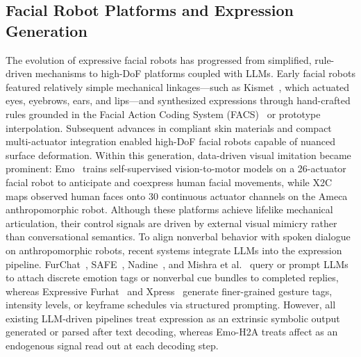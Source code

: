 \documentclass[letterpaper, 10 pt, conference]{ieeeconf}
\begin{document}
\subsection{Facial Robot Platforms and Expression Generation}
The evolution of expressive facial robots has progressed from simplified, rule-driven mechanisms to high-DoF platforms coupled with LLMs. Early facial robots featured relatively simple mechanical linkages---such as Kismet~\cite{breazeal2002designing}, which actuated eyes, eyebrows, ears, and lips---and synthesized expressions through hand-crafted rules grounded in the Facial Action Coding System (FACS)~\cite{ekman1978facs} or prototype interpolation. Subsequent advances in compliant skin materials and compact multi-actuator integration enabled high-DoF facial robots capable of nuanced surface deformation. Within this generation, data-driven visual imitation became prominent: Emo~\cite{hu2024emo} trains self-supervised vision-to-motor models on a 26-actuator facial robot to anticipate and coexpress human facial movements, while X2C~\cite{li2025x2c} maps observed human faces onto 30 continuous actuator channels on the Ameca anthropomorphic robot. Although these platforms achieve lifelike mechanical articulation, their control signals are driven by external visual mimicry rather than conversational semantics. To align nonverbal behavior with spoken dialogue on anthropomorphic robots, recent systems integrate LLMs into the expression pipeline. FurChat~\cite{cherakara2023furchat}, SAFE~\cite{lee2023safe}, Nadine~\cite{kang2024nadine}, and Mishra et al.~\cite{mishra2023realtime} query or prompt LLMs to attach discrete emotion tags or nonverbal cue bundles to completed replies, whereas Expressive Furhat~\cite{abbo2025expressive} and Xpress~\cite{antony2025xpress} generate finer-grained gesture tags, intensity levels, or keyframe schedules via structured prompting. However, all existing LLM-driven pipelines treat expression as an extrinsic symbolic output generated or parsed after text decoding, whereas Emo-H2A treats affect as an endogenous signal read out at each decoding step.
\end{document}
